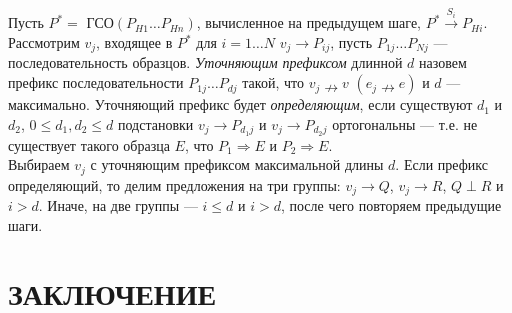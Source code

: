 \documentclass[12pt]{article}
\begin{document}
\indent Пусть $P^{*} = $ ГСО$(P_{H1} \ldots P_{Hn})$, вычисленное на предыдущем шаге, $P^{*} \xrightarrow{S_i} P_{Hi}$. Рассмотрим $v_j$, входящее в $P^*$ для $i = 1 \ldots N$ $v_j \to P_{ij}$, пусть $P_{1j} \ldots P_{Nj}$ --- последовательность образцов. \textit{Уточняющим префиксом} длинной $d$ назовем префикс последовательности $P_{1j} \ldots P_{dj}$ такой, что $v_j \nrightarrow v$ $(e_j \nrightarrow e)$ и $d$ --- максимально. Уточняющий префикс будет \textit{определяющим}, если существуют $d_1$ и $d_2$, $0 \leq d_1, d_2 \leq d$ подстановки $v_j \to P_{d_1j}$ и $v_j \to P_{d_2j}$ ортогональны --- т.е. не существует такого образца $E$, что $P_1 \Rightarrow E$ и $P_2 \Rightarrow E$.\\
\indent Выбираем $v_j$ с уточняющим префиксом максимальной длины $d$. Если префикс определяющий, то делим предложения на три группы: $v_j \to Q$, $v_j \to R$, $Q \perp R$ и $i > d$. Иначе, на две группы --- $i \leq d$ и $i > d$, после чего повторяем предыдущие шаги.

\clearpage
\newpage

\part*{\large \centering ЗАКЛЮЧЕНИЕ}
\hspace{\parindent}

\clearpage
\newpage
\begin{flushleft}
\end{flushleft}
\end{document}

